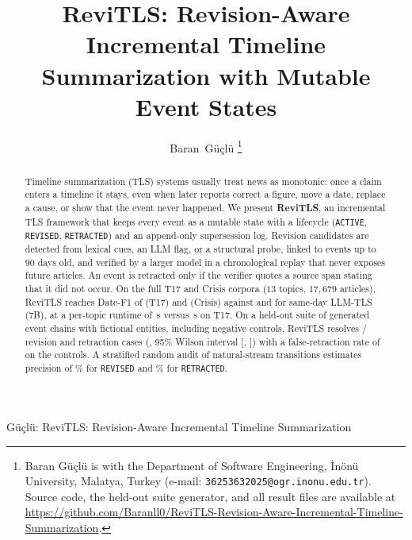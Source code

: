 \documentclass[journal]{IEEEtran}
\begin{document}
\title{ReviTLS: Revision-Aware Incremental Timeline Summarization with Mutable Event States}

\author{Baran~G\"{u}\c{c}l\"{u}%
\thanks{Baran G\"{u}\c{c}l\"{u} is with the Department of Software Engineering, \.{I}n\"{o}n\"{u} University, Malatya, Turkey (e-mail: \texttt{36253632025@ogr.inonu.edu.tr}). Source code, the held-out suite generator, and all result files are available at \protect\url{https://github.com/Baranll0/ReviTLS-Revision-Aware-Incremental-Timeline-Summarization}.}}

%
{G\"{u}\c{c}l\"{u}: ReviTLS: Revision-Aware Incremental Timeline Summarization}

\maketitle

\begin{abstract}
Timeline summarization (TLS) systems usually treat news as monotonic: once a claim enters a timeline it stays, even when later reports correct a figure, move a date, replace a cause, or show that the event never happened. We present \textbf{ReviTLS}, an incremental TLS framework that keeps every event as a mutable state with a lifecycle (\texttt{ACTIVE}, \texttt{REVISED}, \texttt{RETRACTED}) and an append-only supersession log. Revision candidates are detected from lexical cues, an LLM flag, or a structural probe, linked to events up to $90$ days old, and verified by a larger model in a chronological replay that never exposes future articles. An event is retracted only if the verifier quotes a source span stating that it did not occur. On the full T17 and Crisis corpora ($13$ topics, $17{,}679$ articles), ReviTLS reaches Date-F1 of \DateFTDual{} (T17) and \DateFCDual{} (Crisis) against \DateFTLSeven{} and \DateFCLSeven{} for same-day LLM-TLS (7B), at a per-topic runtime of \TimeTDual{}\,s versus \TimeTLSeven{}\,s on T17. On a held-out suite of \HeldN{} generated event chains with fictional entities, including \HeldNeg{} negative controls, ReviTLS resolves \HeldFullK{}/\HeldPos{} revision and retraction cases (\HeldFullRRA{}, 95\% Wilson interval [\HeldFullLo{}, \HeldFullHi{}]) with a false-retraction rate of \HeldFullFalseRetr{} on the controls. A stratified random audit of natural-stream transitions estimates precision of \AuditRevPrec{}\% for \texttt{REVISED} and \AuditRetPrec{}\% for \texttt{RETRACTED}.
\end{abstract}
\end{document}
